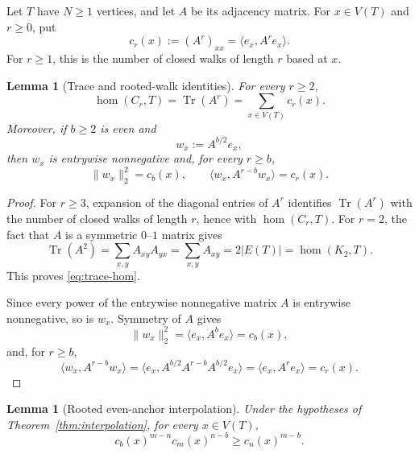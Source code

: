 \documentclass[11pt]{article}
\newtheorem{lemma}[theorem]{Lemma}
\theoremstyle{definition}
\theoremstyle{remark}
\newcommand{\homn}{\operatorname{hom}}
\newcommand{\tr}{\operatorname{Tr}}
\begin{document}
Let $T$ have $N\ge1$ vertices, and let $A$ be its adjacency matrix.
For $x\in V(T)$ and $r\ge0$, put
\[
  c_r(x):=(A^r)_{xx}=\langle e_x,A^r e_x\rangle.
\]
For $r\ge1$, this is the number of closed walks of length $r$ based at
$x$.

\begin{lemma}[Trace and rooted-walk identities]
  \label{lem:rooted-identities}
  For every $r\ge2$,
  \begin{equation}
    \homn(C_r,T)=\tr(A^r)=\sum_{x\in V(T)}c_r(x).
    \label{eq:trace-hom}
  \end{equation}
  Moreover, if $b\ge2$ is even and
  \[
    w_x:=A^{b/2}e_x,
  \]
  then $w_x$ is entrywise nonnegative and, for every $r\ge b$,
  \begin{equation}
    \|w_x\|_2^2=c_b(x),
    \qquad
    \langle w_x,A^{r-b}w_x\rangle=c_r(x).
    \label{eq:anchor-identities}
  \end{equation}
\end{lemma}

\begin{proof}
  For $r\ge3$, expansion of the diagonal entries of $A^r$ identifies
  $\tr(A^r)$ with the number of closed walks of length $r$, hence with
  $\homn(C_r,T)$.  For $r=2$, the fact that $A$ is a symmetric
  $0$--$1$ matrix gives
  \[
    \tr(A^2)
    =\sum_{x,y}A_{xy}A_{yx}
    =\sum_{x,y}A_{xy}
    =2|E(T)|
    =\homn(K_2,T).
  \]
  This proves \eqref{eq:trace-hom}.

  Since every power of the entrywise nonnegative matrix $A$ is
  entrywise nonnegative, so is $w_x$.  Symmetry of $A$ gives
  \[
    \|w_x\|_2^2
    =\langle e_x,A^b e_x\rangle=c_b(x),
  \]
  and, for $r\ge b$,
  \[
    \langle w_x,A^{r-b}w_x\rangle
    =\langle e_x,A^{b/2}A^{r-b}A^{b/2}e_x\rangle
    =\langle e_x,A^r e_x\rangle=c_r(x).
  \]
\end{proof}

\begin{lemma}[Rooted even-anchor interpolation]
  \label{lem:rooted-interpolation}
  Under the hypotheses of Theorem~\ref{thm:interpolation}, for every
  $x\in V(T)$,
  \begin{equation}
    c_b(x)^{m-n}c_m(x)^{n-b}
    \ge c_n(x)^{m-b}.
    \label{eq:rooted-interpolation}
  \end{equation}
\end{lemma}
\end{document}
